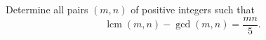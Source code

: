 Determine all pairs $(m, n)$ of positive integers such that
$$\operatorname{lcm}(m,n) - \gcd(m,n) = \frac{mn}{5}.$$
